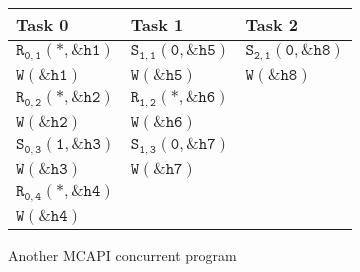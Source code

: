 \begin{figure}
\begin{center}
\setlength{\tabcolsep}{2pt}
\begin{tabular}[c]{l|l|l}
Task 0 & Task 1 & Task 2 \\
\hline
$\mathtt{R_{0,1}(*,\&h1)}$ & $\mathtt{S_{1,1}(0,\&h5)}$ & $\mathtt{S_{2,1}(0,\&h8)}$\\
$\mathtt{W(\&h1)}$&$\mathtt{W(\&h5)}$&$\mathtt{W(\&h8)}$\\
$\mathtt{R_{0,2}(*,\&h2)}$ & $\mathtt{R_{1,2}(*,\&h6)}$ & \\
$\mathtt{W(\&h2)}$&$\mathtt{W(\&h6)}$&\\
$\mathtt{S_{0,3}(1,\&h3)}$ & $\mathtt{S_{1,3}(0,\&h7)}$ & \\
$\mathtt{W(\&h3)}$&$\mathtt{W(\&h7)}$&\\
$\mathtt{R_{0,4}(*,\&h4)}$ & & \\
$\mathtt{W(\&h4)}$&&\\


\end{tabular}
\end{center}
\caption{Another MCAPI concurrent program}
\label{fig:mcapi1}
\end{figure}

